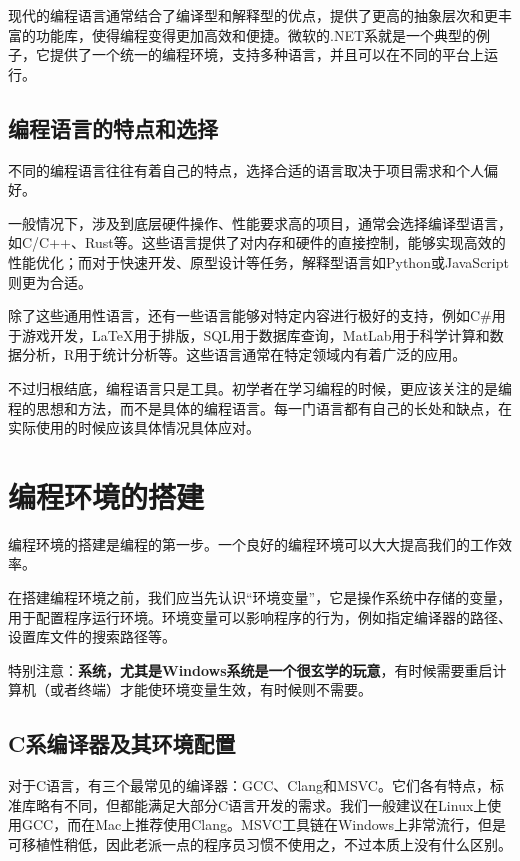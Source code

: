 \documentclass[../main.tex]{subfiles}
\begin{document}
现代的编程语言通常结合了编译型和解释型的优点，提供了更高的抽象层次和更丰富的功能库，使得编程变得更加高效和便捷。微软的.NET系就是一个典型的例子，它提供了一个统一的编程环境，支持多种语言，并且可以在不同的平台上运行。

\subsection{编程语言的特点和选择}

不同的编程语言往往有着自己的特点，选择合适的语言取决于项目需求和个人偏好。

一般情况下，涉及到底层硬件操作、性能要求高的项目，通常会选择编译型语言，如C/C++、Rust等。这些语言提供了对内存和硬件的直接控制，能够实现高效的性能优化；而对于快速开发、原型设计等任务，解释型语言如Python或JavaScript则更为合适。

除了这些通用性语言，还有一些语言能够对特定内容进行极好的支持，例如C\#用于游戏开发，LaTeX用于排版，SQL用于数据库查询，MatLab用于科学计算和数据分析，R用于统计分析等。这些语言通常在特定领域内有着广泛的应用。

不过归根结底，编程语言只是工具。初学者在学习编程的时候，更应该关注的是编程的思想和方法，而不是具体的编程语言。每一门语言都有自己的长处和缺点，在实际使用的时候应该具体情况具体应对。

\section{编程环境的搭建}

编程环境的搭建是编程的第一步。一个良好的编程环境可以大大提高我们的工作效率。

在搭建编程环境之前，我们应当先认识“环境变量”，它是操作系统中存储的变量，用于配置程序运行环境。环境变量可以影响程序的行为，例如指定编译器的路径、设置库文件的搜索路径等。

特别注意：\textbf{系统，尤其是Windows系统是一个很玄学的玩意}，有时候需要重启计算机（或者终端）才能使环境变量生效，有时候则不需要。

\subsection{C系编译器及其环境配置}

对于C语言，有三个最常见的编译器：GCC、Clang和MSVC。它们各有特点，标准库略有不同，但都能满足大部分C语言开发的需求。我们一般建议在Linux上使用GCC，而在Mac上推荐使用Clang。MSVC工具链在Windows上非常流行，但是可移植性稍低，因此老派一点的程序员习惯不使用之，不过本质上没有什么区别。
\end{document}
